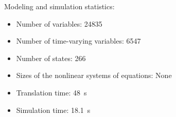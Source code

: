 \begin{contextbox}
  Modeling and simulation statistics:
  \begin{itemize}
    \item Number of variables: 24835
    \item Number of time-varying variables: 6547
    \item Number of states: 266
    \item Sizes of the nonlinear systems of equations: None
    \item Translation time: \SI{48}{s}
    \item Simulation time: \SI{18.1}{s}
  \end{itemize}
\end{contextbox}